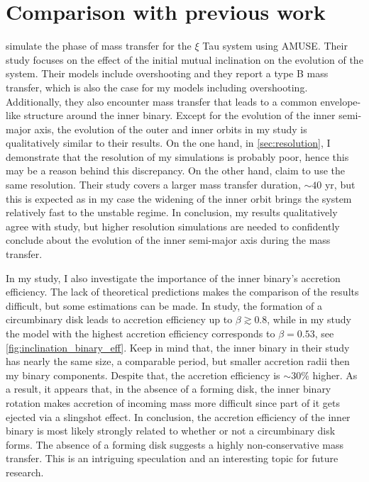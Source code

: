 \section{Comparison with previous work}

\cite{de2014evolution} simulate the phase of mass transfer for the $\xi$ Tau system using AMUSE. Their study focuses on the effect of the initial mutual inclination on the evolution of the system. Their models include overshooting and they report a type B mass transfer, which is also the case for my models including overshooting. Additionally, they also encounter mass transfer that leads to a common envelope-like structure around the inner binary. Except for the evolution of the inner semi-major axis, the evolution of the outer and inner orbits in my study is qualitatively similar to their results. On the one hand, in \cref{sec:resolution}, I demonstrate that the resolution of my simulations is probably poor, hence this may be a reason behind this discrepancy. On the other hand, \cite{de2014evolution} claim to use the same resolution. Their study covers a larger mass transfer duration, $\sim 40$ yr, but this is expected as in my case the widening of the inner orbit brings the system relatively fast to the unstable regime. In conclusion, my results qualitatively agree with \cite{de2014evolution} study, but higher resolution simulations are needed to confidently conclude about the evolution of the inner semi-major axis during the mass transfer.

In my study, I also investigate the importance of the inner binary's accretion efficiency. The lack of theoretical predictions makes the comparison of the results difficult, but some estimations can be made. In \cite{zwart2019triple} study, the formation of a circumbinary disk leads to accretion efficiency up to $\beta \gtrsim 0.8$, while in my study the model with the highest accretion efficiency corresponds to $\beta = 0.53$, see \cref{fig:inclination_binary_eff}. Keep in mind that, the inner binary in their study has nearly the same size, a comparable period, but smaller accretion radii then my binary components. Despite that, the accretion efficiency is $\sim 30\%$ higher. As a result, it appears that, in the absence of a forming disk, the inner binary rotation makes accretion of incoming mass more difficult since part of it gets ejected via a slingshot effect. In conclusion, the accretion efficiency of the inner binary is most likely strongly related to whether or not a circumbinary disk forms. The absence of a forming disk suggests a highly non-conservative mass transfer. This is an intriguing speculation and an interesting topic for future research.

